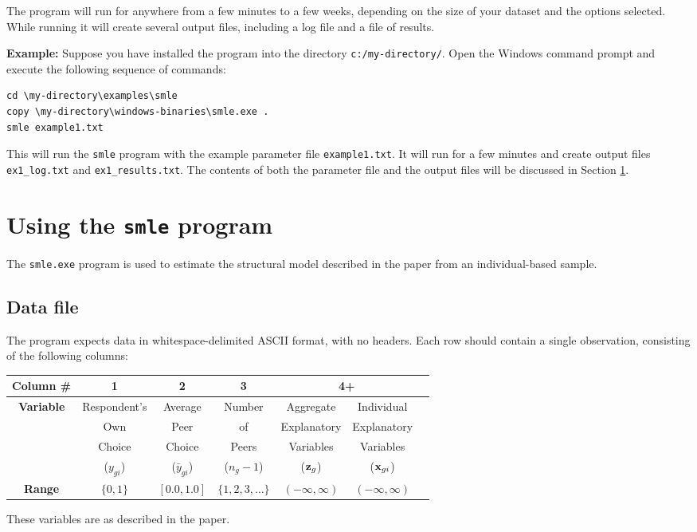 \documentclass{article}
\begin{document}
The program will run for anywhere from a few minutes to a few weeks,
depending on the size of your dataset and the options selected.
While running it will create several output files, including 
a log file and a file of results.

{\bf Example:} Suppose you have installed the program into
the directory {\tt c:/my-directory/}.  Open the Windows
command prompt and execute the following sequence of 
commands:
\begin{verbatim}
cd \my-directory\examples\smle
copy \my-directory\windows-binaries\smle.exe .
smle example1.txt
\end{verbatim}
This will run the {\tt smle} program with the example parameter file
{\tt example1.txt}.  It will run for a few minutes and 
create output files {\tt ex1\_log.txt} and {\tt ex1\_results.txt}.
The contents of both the parameter file and the output files
will be discussed in Section \ref{sec:smle}.


\section{Using the {\tt smle} program }\label{sec:smle}

The {\tt smle.exe} program is used to estimate the structural model 
described in the paper from an individual-based sample.  

\subsection{Data file}

The program expects data in whitespace-delimited ASCII format, with
no headers.  Each row should contain a single observation,
consisting of the following columns:
\begin{center}
\begin{tabular}{|c|c|c|c|c|c p{0in}|}
\hline
{\footnotesize {\bf Column \# }} & {\footnotesize 1} & {\footnotesize 2} & {\footnotesize 3} & \multicolumn{2}{c}{\footnotesize 4+}  & \\ 
\hline
{\footnotesize {\bf Variable }} & {\footnotesize Respondent's} & {\footnotesize Average} & {\footnotesize Number} & {\footnotesize Aggregate} & {\footnotesize Individual}  & \\
                & {\footnotesize Own}       & {\footnotesize Peer}    & {\footnotesize of}     & {\footnotesize Explanatory}  & {\footnotesize Explanatory} & \\
				        & {\footnotesize Choice}  & {\footnotesize Choice}  & {\footnotesize Peers}  & {\footnotesize Variables} & {\footnotesize Variables} & \\
 & ($y_{gi}$) & ($\bar{y}_{gi}$) & ($n_g-1$) & (${\bf z}_g$) & (${\bf x}_{gi}$) & \\
\hline
{\footnotesize {\bf Range }} & {\footnotesize $\{0,1\}$} & {\footnotesize $[0.0,1.0]$} & {\footnotesize $\{1,2,3,\ldots\}$} & {\footnotesize $(-\infty,\infty)$} & {\footnotesize $(-\infty,\infty)$} & \\
\hline
\end{tabular}
\end{center}
These variables are as described in the paper.
\end{document}
